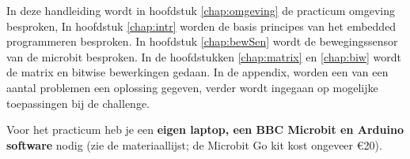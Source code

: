 In deze handleiding wordt in hoofdstuk \ref{chap:omgeving} de practicum omgeving besproken, In hoofdstuk \ref{chap:intr} worden de basis principes van het embedded programmeren besproken. In hoofdstuk \ref{chap:bewSen} wordt de bewegingssensor van de microbit besproken. In de hoofdstukken \ref{chap:matrix} en \ref{chap:biw} wordt de matrix en bitwise bewerkingen gedaan.
In de appendix, worden een van een aantal problemen een oplossing gegeven, verder wordt ingegaan op mogelijke toepassingen bij de challenge.

Voor het practicum heb je een \textbf{eigen laptop, een BBC Microbit en Arduino software} nodig 
(zie de materiaallijst; de Microbit Go kit kost ongeveer \euro{}20). 